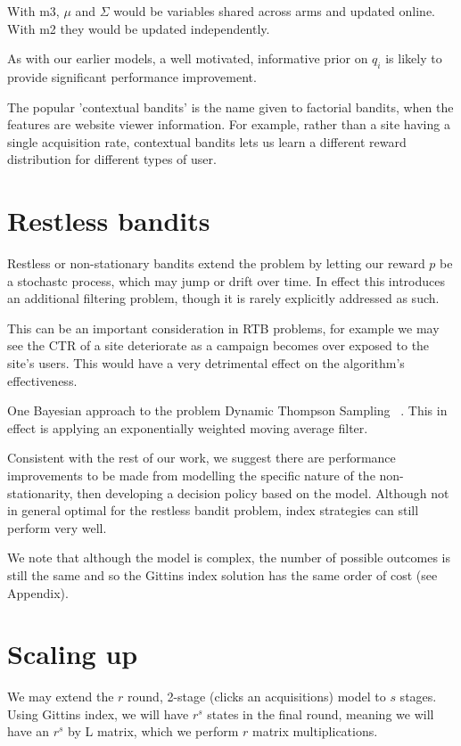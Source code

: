 \documentclass[11pt,a4,singlespacing,titlepagenumber=on]{scrreprt}
\numberwithin{equation}{chapter} %
\theoremstyle{remark}
\begin{document}
With m3, $\mu$ and $\Sigma$ would be variables shared across arms and updated online. With m2 they would be updated independently.

As with our earlier models, a well motivated, informative prior on $q_i$ is likely to provide significant performance improvement.

The popular 'contextual bandits' is the name given to factorial bandits, when the features are website viewer information. For example, rather than a site having a single acquisition rate, contextual bandits lets us learn a different reward distribution for different types of user.

\section{Restless bandits}

Restless or non-stationary bandits extend the problem by letting our reward $p$ be a stochastc process, which may jump or drift over time. In effect this introduces an additional filtering problem, though it is rarely explicitly addressed as such.

This can be an important consideration in RTB problems, for example we may see the CTR of a site deteriorate as a campaign becomes over exposed to the site's users. This would have a very detrimental effect on the algorithm's effectiveness.

One Bayesian approach to the problem Dynamic Thompson Sampling ~\cite{gupta2011thompson}. This in effect is applying an exponentially weighted moving average filter. 

Consistent with the rest of our work, we suggest there are performance improvements to be made from modelling the specific nature of the non-stationarity, then developing a decision policy based on the model. Although not in general optimal for the restless bandit problem, index strategies can still perform very well. 

We note that although the model is complex, the number of possible outcomes is still the same and so the Gittins index solution has the same order of cost (see Appendix).

\section{Scaling up}

We may extend the $r$ round, 2-stage (clicks an acquisitions) model to $s$ stages. Using Gittins index, we will have $r^s$ states in the final round, meaning we will have an $r^s$ by L matrix, which we perform $r$ matrix multiplications.
\end{document}
